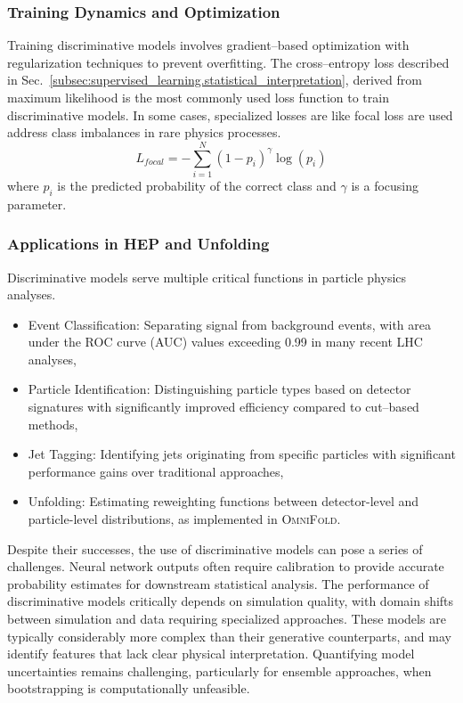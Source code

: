     \subsubsection{Training Dynamics and Optimization}
        Training discriminative models involves gradient--based optimization with regularization techniques to prevent overfitting.
        The cross--entropy loss described in Sec.~\ref{subsec:supervised_learning.statistical_interpretation}, derived from maximum likelihood is the most commonly used loss function to train discriminative models.
        In some cases, specialized losses are like focal loss are used address class imbalances in rare physics processes.
        \begin{equation}
            L_{focal} = -\sum_{i=1}^N (1-p_i)^\gamma \log(p_i)
        \end{equation}
        where \(p_i\) is the predicted probability of the correct class and \(\gamma\) is a focusing parameter.

    \subsubsection{Applications in HEP and Unfolding}
        Discriminative models serve multiple critical functions in particle physics analyses.
        \begin{itemize}
            \item Event Classification: Separating signal from background events, with area under the ROC curve (AUC) values exceeding 0.99 in many recent LHC analyses,
            \item Particle Identification: Distinguishing particle types based on detector signatures with significantly improved efficiency compared to cut--based methods,
            \item Jet Tagging: Identifying jets originating from specific particles with significant performance gains over traditional approaches,
            \item Unfolding: Estimating reweighting functions between detector-level and particle-level distributions, as implemented in \textsc{OmniFold}.
        \end{itemize}
        Despite their successes, the use of discriminative models can pose a series of challenges.
        Neural network outputs often require calibration to provide accurate probability estimates for downstream statistical analysis.
        The performance of discriminative models critically depends on simulation quality, with domain shifts between simulation and data requiring specialized approaches.
        These models are typically considerably more complex than their generative counterparts, and may identify features that lack clear physical interpretation.
        Quantifying model uncertainties remains challenging, particularly for ensemble approaches, when bootstrapping is computationally unfeasible.

